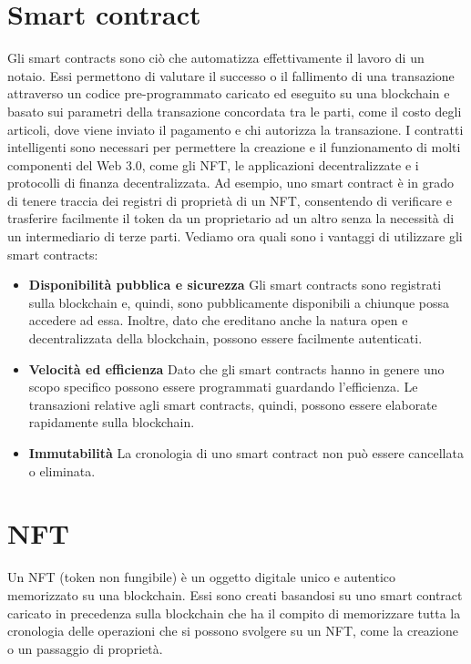 \documentclass[12pt]{report}
\begin{document}
\section{Smart contract}
Gli smart contracts sono ciò che automatizza effettivamente il lavoro di un notaio. Essi permettono di valutare il successo o il fallimento di una transazione attraverso un codice pre-programmato caricato ed eseguito su una blockchain e basato sui parametri della transazione concordata tra le parti, come il costo degli articoli, dove viene inviato il pagamento e chi autorizza la transazione.\newline
I contratti intelligenti sono necessari per permettere la creazione e il funzionamento di molti componenti del Web 3.0, come gli NFT, le applicazioni decentralizzate e i protocolli di finanza decentralizzata. Ad esempio, uno smart contract è in grado di tenere traccia dei registri di proprietà di un NFT, consentendo di verificare e trasferire facilmente il token da un proprietario ad un altro senza la necessità di un intermediario di terze parti.\newline\newline
Vediamo ora quali sono i vantaggi di utilizzare gli smart contracts:
\begin{itemize}[topsep=5pt, itemsep=0pt]
    \item \textbf{Disponibilità pubblica e sicurezza}\newline
    Gli smart contracts sono registrati sulla blockchain e, quindi, sono pubblicamente disponibili a chiunque possa accedere ad essa. Inoltre, dato che ereditano anche la natura open e decentralizzata della blockchain, possono essere facilmente autenticati.
    \item \textbf{Velocità ed efficienza}\newline
    Dato che gli smart contracts hanno in genere uno scopo specifico possono essere programmati guardando l'efficienza. Le transazioni relative agli smart contracts, quindi, possono essere elaborate rapidamente sulla blockchain.
    \item \textbf{Immutabilità}\newline
    La cronologia di uno smart contract non può essere cancellata o eliminata. \cite{Cinque}
\end{itemize}
\newpage

\section{NFT}
Un NFT (token non fungibile) è un oggetto digitale unico e autentico memorizzato su una blockchain.\newline
Essi sono creati basandosi su uno smart contract caricato in precedenza sulla blockchain che ha il compito di memorizzare tutta la cronologia delle operazioni che si possono svolgere su un NFT, come la creazione o un passaggio di proprietà. \cite{Sei}
\end{document}
